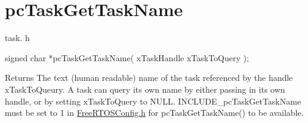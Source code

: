 \hypertarget{group__pc_task_get_task_name}{\section{pc\-Task\-Get\-Task\-Name}
\label{group__pc_task_get_task_name}
}
task. h 
\begin{DoxyPre}signed char *pcTaskGetTaskName( xTaskHandle xTaskToQuery );\end{DoxyPre}


\begin{DoxyReturn}{Returns}
The text (human readable) name of the task referenced by the handle x\-Task\-To\-Queury. A task can query its own name by either passing in its own handle, or by setting x\-Task\-To\-Query to N\-U\-L\-L. I\-N\-C\-L\-U\-D\-E\-\_\-pc\-Task\-Get\-Task\-Name must be set to 1 in \hyperlink{_free_r_t_o_s_config_8h_source}{Free\-R\-T\-O\-S\-Config.\-h} for pc\-Task\-Get\-Task\-Name() to be available. 
\end{DoxyReturn}
